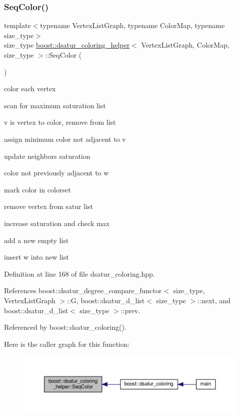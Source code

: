 \subsubsection{\texorpdfstring{Seq\+Color()}{SeqColor()}}
{\footnotesize\ttfamily template$<$typename Vertex\+List\+Graph, typename Color\+Map, typename size\+\_\+type$>$ \\
size\+\_\+type \hyperlink{classboost_1_1dsatur__coloring__helper}{boost\+::dsatur\+\_\+coloring\+\_\+helper}$<$ Vertex\+List\+Graph, Color\+Map, size\+\_\+type $>$\+::Seq\+Color (\begin{DoxyParamCaption}{ }\end{DoxyParamCaption})\hspace{0.3cm}{\ttfamily [inline]}}

color each vertex

scan for maximum saturation list

v is vertex to color, remove from list

assign minimum color not adjacent to v

update neighbors saturation

color not previously adjacent to w

mark color in colorset

remove vertex from satur list

increase saturation and check max

add a new empty list

insert w into new list 

Definition at line 168 of file dsatur\+\_\+coloring.\+hpp.



References boost\+::dsatur\+\_\+degree\+\_\+compare\+\_\+functor$<$ size\+\_\+type, Vertex\+List\+Graph $>$\+::G, boost\+::dsatur\+\_\+d\+\_\+list$<$ size\+\_\+type $>$\+::next, and boost\+::dsatur\+\_\+d\+\_\+list$<$ size\+\_\+type $>$\+::prev.



Referenced by boost\+::dsatur\+\_\+coloring().

Here is the caller graph for this function\+:
\nopagebreak
\begin{figure}[H]
\begin{center}
\leavevmode
\includegraphics[width=350pt]{d3/d30/classboost_1_1dsatur__coloring__helper_a98b34621fd34aa9acf2ae7dcf1a54506_icgraph}
\end{center}
\end{figure}


